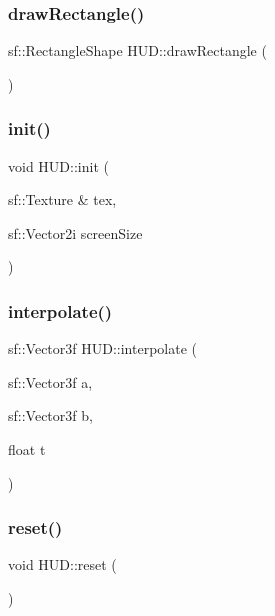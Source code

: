 \subsubsection{\texorpdfstring{draw\+Rectangle()}{drawRectangle()}}
{\footnotesize\ttfamily sf\+::\+Rectangle\+Shape H\+U\+D\+::draw\+Rectangle (\begin{DoxyParamCaption}{ }\end{DoxyParamCaption})}

\mbox{\label{class_h_u_d_abcd24489d983e367e38f1ee35e4f0cef}} 
\subsubsection{\texorpdfstring{init()}{init()}}
{\footnotesize\ttfamily void H\+U\+D\+::init (\begin{DoxyParamCaption}\item[{sf\+::\+Texture \&}]{tex,  }\item[{sf\+::\+Vector2i}]{screen\+Size }\end{DoxyParamCaption})}

\mbox{\label{class_h_u_d_aeb9ac3973c124a7e893d6c3cc9c8688f}} 
\subsubsection{\texorpdfstring{interpolate()}{interpolate()}}
{\footnotesize\ttfamily sf\+::\+Vector3f H\+U\+D\+::interpolate (\begin{DoxyParamCaption}\item[{sf\+::\+Vector3f}]{a,  }\item[{sf\+::\+Vector3f}]{b,  }\item[{float}]{t }\end{DoxyParamCaption})}

\mbox{\label{class_h_u_d_a9800d7a76e53e33264f444fd5c863bff}} 
\subsubsection{\texorpdfstring{reset()}{reset()}}
{\footnotesize\ttfamily void H\+U\+D\+::reset (\begin{DoxyParamCaption}{ }\end{DoxyParamCaption})}

